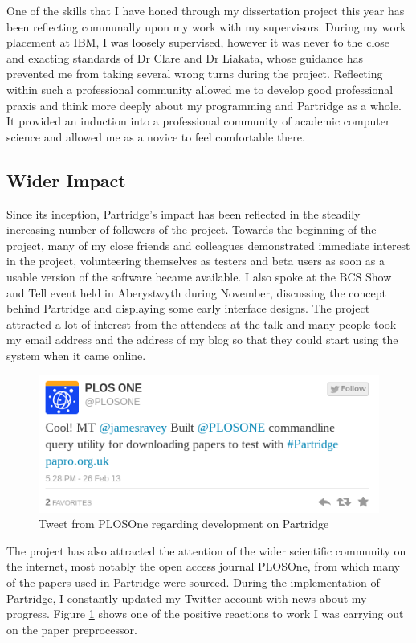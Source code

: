 One of the skills that I have honed through my dissertation project this year
has been reflecting communally upon my work with my supervisors. During my work
placement at IBM, I was loosely supervised, however it was never to the close
and exacting standards of Dr Clare and Dr Liakata, whose guidance has 
prevented me from taking several wrong turns during the project. Reflecting
within such a professional community allowed me to develop good professional
praxis and think more deeply about my programming and Partridge as a whole. It
provided an induction into a professional community of academic computer
science and allowed me as a novice to feel comfortable there. 


\subsection{Wider Impact}

Since its inception, Partridge's impact has been reflected in the steadily
increasing number of followers of the project. Towards the beginning of the
project, many of my close friends and colleagues demonstrated immediate
interest in the project, volunteering themselves as testers and beta users as
soon as a usable version of the software became available. I also spoke at the
BCS Show and Tell event held in Aberystwyth during November, discussing the
concept behind Partridge and displaying some early interface designs. The
project attracted a lot of interest from the attendees at the talk and many
people took my email address and the address of my blog so that they could
start using the system when it came online.

\begin{figure}[!h]
\centering
\includegraphics[width=\textwidth]{images/evaluation/plostweet.png}
\caption{Tweet from PLOSOne regarding development on Partridge}
\label{fig:plostweet}
\end{figure}

The project has also attracted the attention of the wider scientific community
on the internet, most notably the open access journal PLOSOne, from which many
of the papers used in Partridge were sourced. During the implementation of
Partridge, I constantly updated my Twitter account with news about my
progress. Figure \ref{fig:plostweet} shows one of the positive reactions to
work I was carrying out on the paper preprocessor.


